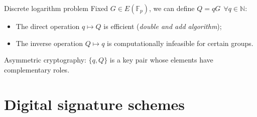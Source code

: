 \documentclass[slidescentered]{beamer}
\begin{document}
    
    \begin{frame}{Discrete logarithm problem}
    	Fixed $G \in E(\mathbb{F}_p)$, we can define $Q = qG \ \ \forall q \in \mathbb{N}$:
    	\begin{itemize}
    		\item The direct operation $q \mapsto Q$ is efficient (\textit{double and add algorithm});
    		\item The inverse operation $Q \mapsto q$ is computationally infeasible for certain groups.
    	\end{itemize}
    	
    	\bigskip
    	\noindent
    	Asymmetric cryptography: $\{q, Q\}$ is a key pair whose elements have complementary roles.
	\end{frame}
    
    \section{Digital signature schemes}
    
\end{document}
